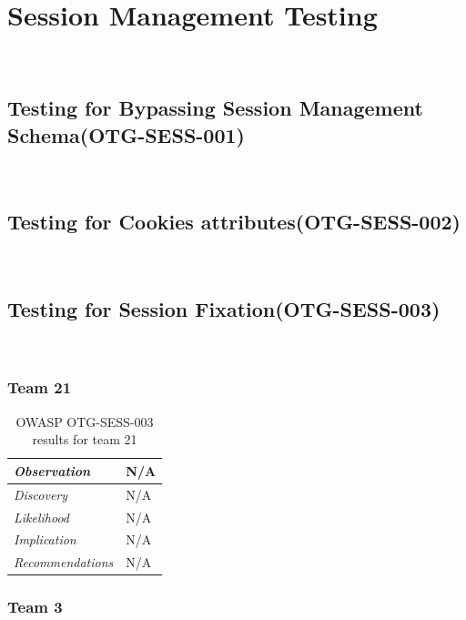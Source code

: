 \documentclass[headsepline,footsepline,footinclude=false,oneside,fontsize=11pt,paper=a4,listof=totoc,bibliography=totoc]{scrbook} %
\begin{document}
\pagebreak 
\section{Session Management Testing}\
\subsection{Testing for Bypassing Session Management Schema(OTG-SESS-001)}\
\pagebreak 
\subsection{Testing for Cookies attributes(OTG-SESS-002)}\
\pagebreak 
\subsection{Testing for Session Fixation(OTG-SESS-003)}\

 
 \subsubsection{Team 21}
 
 \begin{table}[H]
 	\centering
 	\begin{tabular}{l p{11cm}} 
 		\textit{Observation} &  N/A\\ 
 		\hline
 		\textit{Discovery} &  N/A \\
 		\hline
 		\textit{Likelihood} & N/A\\
 		\hline
 		\textit{Implication} & N/A\\
 		\hline
 		\textit{Recommendations} & N/A\\ 
 	\end{tabular}
 	\caption{OWASP OTG-SESS-003 results for team 21}
 	\label{table:scenario2}
 \end{table}
 
 \subsubsection{Team 3}
 
\end{document}
